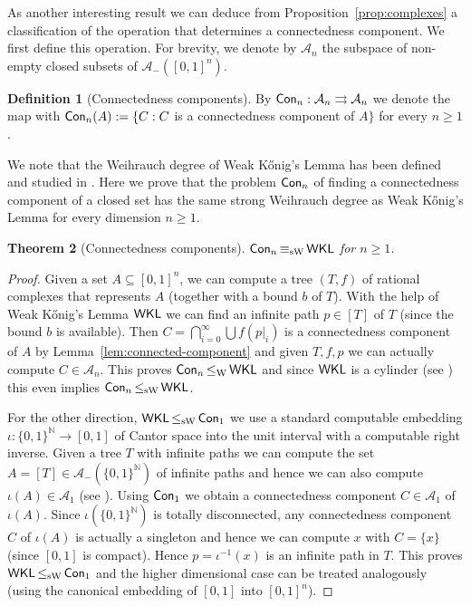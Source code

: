 \documentclass[a4paper]{amsart}
\def\AA{{\mathcal A}}
\def\IN{{\mathbb{N}}}
\def\In{\subseteq}
\def\mto{\rightrightarrows}
\def\WKL{\text{\rm\sffamily WKL}}
\def\Con{\text{\rm\sffamily Con}}
\def\leqW{\mathop{\leq_{\mathrm{W}}}}
\def\leqSW{\mathop{\leq_{\mathrm{sW}}}}
\def\equivSW{\mathop{\equiv_{\mathrm{sW}}}}
\newtheorem{theorem}{Theorem}[section]
\theoremstyle{definition}
\newtheorem{definition}[theorem]{Definition}
\begin{document}
As another interesting result we can deduce from Proposition~\ref{prop:complexes} a classification of the operation 
that determines a connectedness component. We first define this operation.
For brevity, we denote by $\AA_n$ the subspace of non-empty closed subsets of $\AA_-([0,1]^n)$.

\begin{definition}[Connectedness components]
By $\Con_n:\AA_n\mto\AA_n$ we denote the map with $\Con_n(A):=\{C:C$ is a connectedness component of $A\}$ for every $n\geq 1$.
\end{definition}

We note that the Weihrauch degree of Weak K\H{o}nig's Lemma has been defined and studied in \cite{GM09,BG11,BG11a,BBP12,BGM12}.
Here we prove that the problem $\Con_n$ of finding a connectedness component of a closed set has the
same strong Weihrauch degree as Weak K\H{o}nig's Lemma for every dimension $n\geq 1$.

\begin{theorem}[Connectedness components]
\label{thm:Con}
$\Con_n\equivSW\WKL$ for $n\geq 1$.
\end{theorem}
\begin{proof}
Given a set $A\In[0,1]^n$, we can compute a tree $(T,f)$ of rational complexes that represents $A$ (together with a bound $b$ of $T$).
With the help of Weak K\H{o}nig's Lemma $\WKL$ we can find an infinite path $p\in[T]$ of $T$ (since the bound $b$ is available).
Then $C=\bigcap_{i=0}^\infty\bigcup f(p|_i)$ is a connectedness component of $A$ by Lemma~\ref{lem:connected-component}
and given $T,f,p$ we can actually compute $C\in\AA_n$.
This proves $\Con_n\leqW\WKL$ and since $\WKL$ is a cylinder (see \cite{BG11}) this even implies $\Con_n\leqSW\WKL$.

For the other direction, $\WKL\leqSW\Con_1$ we use a standard computable embedding $\iota:\{0,1\}^\IN\to[0,1]$ of Cantor space 
into the unit interval with a computable right inverse. Given a tree $T$ with infinite paths we can compute the set 
$A=[T]\in\AA_-(\{0,1\}^\IN)$ of infinite paths and hence we can also compute $\iota(A)\in\AA_1$ (see \cite{BG09}). 
Using $\Con_1$ we obtain a connectedness component $C\in\AA_1$ of $\iota(A)$.
Since $\iota(\{0,1\}^\IN)$ is totally disconnected, any connectedness component $C$ of $\iota(A)$ is actually a singleton
and hence we can compute $x$ with $C=\{x\}$ (since $[0,1]$ is compact). Hence $p=\iota^{-1}(x)$ is an infinite path in $T$.
This proves $\WKL\leqSW\Con_1$ and the higher dimensional case can be treated analogously (using the canonical embedding of $[0,1]$ into $[0,1]^n$).
\end{proof}
\end{document}
